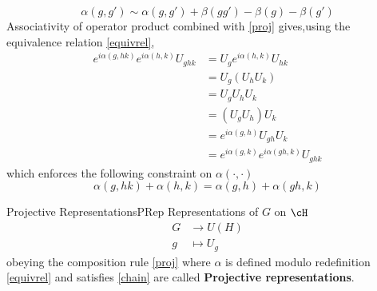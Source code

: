 \begin{equation}\label{equivrel}
    \alpha(g,g') \sim \alpha(g,g') +\beta(gg') -\beta(g) - \beta(g')
\end{equation} 
Associativity of operator product combined with \eqref{proj} gives,using the equivalence relation \eqref{equivrel}, 
\begin{equation}
\begin{aligned}
    e^{i \alpha(g,hk)} e^{i \alpha(h,k)} U_{ghk}&=  U_g e^{i \alpha(h,k) } U_{hk}\\&= U_g (U_h U_k)\\
    &= U_{g} U_h U_k \\
    &= (U_g U_h) U_k\\
    &= e^{i \alpha(g,h)} U_{gh} U_k \\
    &= e^{i \alpha(g,k)} e^{i \alpha(gh,k)} U_{ghk}
    \end{aligned}
\end{equation}
which enforces the following constraint on $\alpha(\cdot, \cdot)$
\begin{equation}\label{chain}
    \alpha(g,hk) + \alpha(h,k) = \alpha(g,h) + \alpha(gh,k)
\end{equation}

\begin{defn}{Projective Representations}{PRep}
Representations of $G$ on $\cH$
    \begin{equation}
        \begin{aligned}
            G &\to U(H)\\
            g &\mapsto U_g
        \end{aligned}
    \end{equation}
obeying the composition rule \eqref{proj} where $\alpha$ is defined modulo redefinition \eqref{equivrel} and satisfies \eqref{chain} are called \textbf{Projective representations}.
\end{defn}

